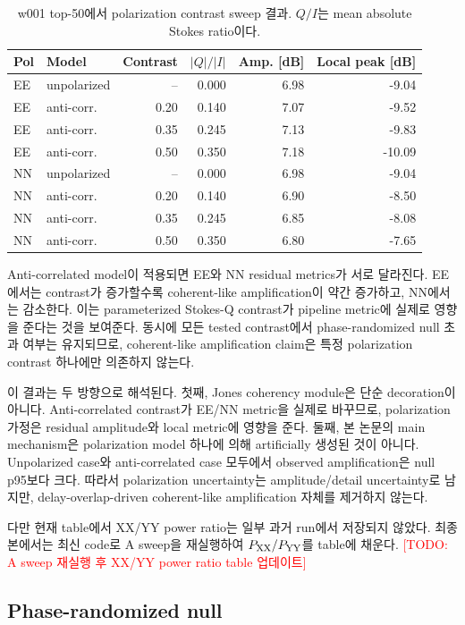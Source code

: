 \documentclass[11pt,a4paper]{article}
\newcommand{\todo}[1]{\textcolor{red}{[TODO: #1]}}
\begin{document}
\begin{table}[t]
\centering
\caption{w001 top-50에서 polarization contrast sweep 결과. $Q/I$는 mean absolute Stokes ratio이다.}
\label{tab:pol-sweep}
\begin{tabular}{llrrrr}
\toprule
Pol & Model & Contrast & $|Q|/|I|$ & Amp. [dB] & Local peak [dB]\\
\midrule
EE & unpolarized & --   & 0.000 & 6.98 & -9.04\\
EE & anti-corr.  & 0.20 & 0.140 & 7.07 & -9.52\\
EE & anti-corr.  & 0.35 & 0.245 & 7.13 & -9.83\\
EE & anti-corr.  & 0.50 & 0.350 & 7.18 & -10.09\\
NN & unpolarized & --   & 0.000 & 6.98 & -9.04\\
NN & anti-corr.  & 0.20 & 0.140 & 6.90 & -8.50\\
NN & anti-corr.  & 0.35 & 0.245 & 6.85 & -8.08\\
NN & anti-corr.  & 0.50 & 0.350 & 6.80 & -7.65\\
\bottomrule
\end{tabular}
\end{table}

Anti-correlated model이 적용되면 EE와 NN residual metrics가 서로 달라진다.
EE에서는 contrast가 증가할수록 coherent-like amplification이 약간 증가하고, NN에서는 감소한다.
이는 parameterized Stokes-Q contrast가 pipeline metric에 실제로 영향을 준다는 것을 보여준다.
동시에 모든 tested contrast에서 phase-randomized null 초과 여부는 유지되므로, coherent-like amplification claim은 특정 polarization contrast 하나에만 의존하지 않는다.

이 결과는 두 방향으로 해석된다.
첫째, Jones coherency module은 단순 decoration이 아니다.
Anti-correlated contrast가 EE/NN metric을 실제로 바꾸므로, polarization 가정은 residual amplitude와 local metric에 영향을 준다.
둘째, 본 논문의 main mechanism은 polarization model 하나에 의해 artificially 생성된 것이 아니다.
Unpolarized case와 anti-correlated case 모두에서 observed amplification은 null p95보다 크다.
따라서 polarization uncertainty는 amplitude/detail uncertainty로 남지만, delay-overlap-driven coherent-like amplification 자체를 제거하지 않는다.

다만 현재 table에서 XX/YY power ratio는 일부 과거 run에서 저장되지 않았다.
최종본에서는 최신 code로 A sweep을 재실행하여 $P_{\rm XX}/P_{\rm YY}$를 table에 채운다.
\todo{A sweep 재실행 후 XX/YY power ratio table 업데이트}

\subsection{Phase-randomized null}
\end{document}
